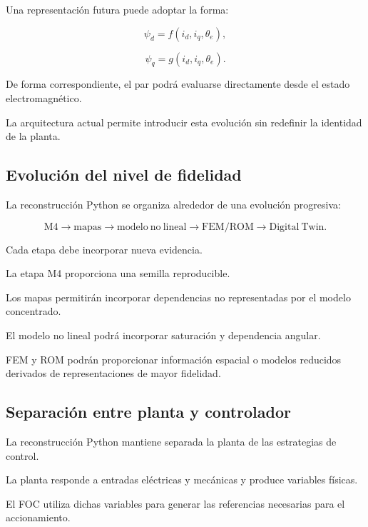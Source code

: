 Una representación futura puede adoptar la forma:

\begin{equation}
\psi_d=
f(i_d,i_q,\theta_e),
\end{equation}

\begin{equation}
\psi_q=
g(i_d,i_q,\theta_e).
\end{equation}

De forma correspondiente, el par podrá evaluarse directamente desde el estado electromagnético.

La arquitectura actual permite introducir esta evolución sin redefinir la identidad de la planta.

\subsection{Evolución del nivel de fidelidad}

La reconstrucción Python se organiza alrededor de una evolución progresiva:

\begin{equation}
\mathrm{M4}
\rightarrow
\mathrm{mapas}
\rightarrow
\mathrm{modelo\ no\ lineal}
\rightarrow
\mathrm{FEM/ROM}
\rightarrow
\mathrm{Digital\ Twin}.
\end{equation}

Cada etapa debe incorporar nueva evidencia.

La etapa M4 proporciona una semilla reproducible.

Los mapas permitirán incorporar dependencias no representadas por el modelo concentrado.

El modelo no lineal podrá incorporar saturación y dependencia angular.

FEM y ROM podrán proporcionar información espacial o modelos reducidos derivados de representaciones de mayor fidelidad.

\subsection{Separación entre planta y controlador}

La reconstrucción Python mantiene separada la planta de las estrategias de control.

La planta responde a entradas eléctricas y mecánicas y produce variables físicas.

El FOC utiliza dichas variables para generar las referencias necesarias para el accionamiento.

